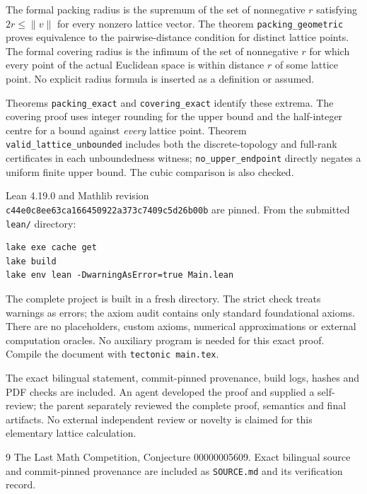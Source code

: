\documentclass[11pt]{article}
\begin{document}
The formal packing radius is the supremum of the set
of nonnegative $r$ satisfying $2r\leq\|v\|$ for every
nonzero lattice vector. The theorem
\texttt{packing\_geometric} proves equivalence to the
pairwise-distance condition for distinct lattice points.
The formal covering radius is the infimum of the set
of nonnegative $r$ for which every point of the actual
Euclidean space is within distance $r$ of some lattice
point. No explicit radius formula is inserted as a
definition or assumed.

Theorems \texttt{packing\_exact} and
\texttt{covering\_exact} identify these extrema.
The covering proof uses integer rounding for the upper
bound and the half-integer centre for a bound against
\emph{every} lattice point. Theorem
\texttt{valid\_lattice\_unbounded} includes both the
discrete-topology and full-rank certificates in each
unboundedness witness; \texttt{no\_upper\_endpoint}
directly negates a uniform finite upper bound.
The cubic comparison is also checked.

Lean 4.19.0 and Mathlib revision\\
\texttt{c44e0c8ee63ca166450922a373c7409c5d26b00b}
are pinned. From the submitted \texttt{lean/} directory:
\begin{verbatim}
lake exe cache get
lake build
lake env lean -DwarningAsError=true Main.lean
\end{verbatim}
The complete project is built in a fresh directory.
The strict check treats warnings as errors; the axiom
audit contains only standard foundational axioms.
There are no placeholders, custom axioms, numerical
approximations or external computation oracles.
No auxiliary program is needed for this exact proof.
Compile the document with \texttt{tectonic main.tex}.

The exact bilingual statement, commit-pinned provenance,
build logs, hashes and PDF checks are included. An agent
developed the proof and supplied a self-review; the
parent separately reviewed the complete proof, semantics
and final artifacts. No external independent review or
novelty is claimed for this elementary lattice calculation.

\begin{thebibliography}{9}
 The Last Math Competition,
Conjecture 00000005609. Exact bilingual source and
commit-pinned provenance are included as \texttt{SOURCE.md}
and its verification record.
\end{thebibliography}
\end{document}
